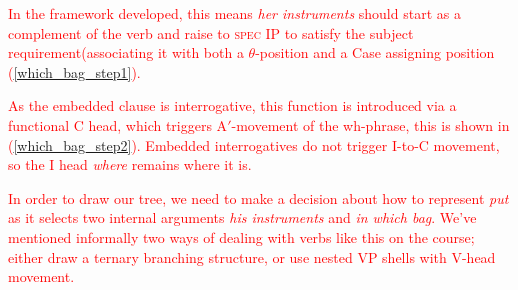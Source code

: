 \documentclass{article}
\begin{document}
\textcolor{red}{In the framework developed, this means \emph{her instruments} should start as a complement of the verb and raise to \textsc{spec} IP to satisfy the subject requirement(associating it with both a $\theta{}$-position and a Case assigning position (\ref{which_bag_step1}).
\begin{exe}
\end{exe}
As the embedded clause is interrogative, this function is introduced via a functional C head, which triggers A$'$-movement of the wh-phrase, this is shown in (\ref{which_bag_step2}).
Embedded interrogatives do not trigger I-to-C movement, so the I head \emph{where} remains where it is.}

\textcolor{red}{In order to draw our tree, we need to make a decision about how to represent \emph{put} as it selects two internal arguments \emph{his instruments} and \emph{in which bag}. We've mentioned informally two ways of dealing with verbs like this on the course; either draw a ternary branching structure, or use nested VP shells with V-head movement.}

\end{document}
